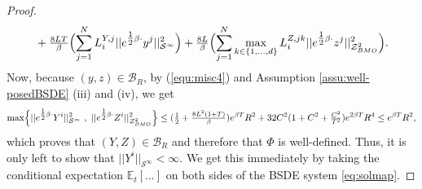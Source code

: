 \documentclass[10pt,a4paper]{article}
\theoremstyle{plain}
\theoremstyle{definition}
\numberwithin{equation}{section}
\begin{document}
\begin{proof}
\begin{align}
& \ \ \ + \tfrac{8LT}{\beta}\Bigl(\sum_{j=1}^{N}L_{i}^{Y,j}||e^{\tfrac{1}{2}\beta\cdot}y^{j}||_{\mathcal{S}^{\infty}}^{2}\Bigr) + \tfrac{8L}{\beta}\Bigl(\sum_{j=1}^{N}\max_{k \in \{1,...,d\}}L_{i}^{Z,jk}||e^{\tfrac{1}{2}\beta\cdot}z^{j}||_{\mathcal{Z}_{BMO}^{2}}^{2}\Bigr).\label{equ:misc4}
\end{align}
Now, because $(y,z) \in \mathcal{B}_{R}$, 
by (\ref{equ:misc4}) and Assumption \ref{assu:well-posedBSDE} (iii) and (iv), we get
\[
\max\Bigl\{||e^{\tfrac{1}{2}\beta\cdot}Y^{i}||_{\mathcal{S}^{\infty}}^{2} \ , \ ||e^{\tfrac{1}{2}\beta\cdot}Z^{i}||_{\mathcal{Z}_{BMO}^{2}}^{2}\Bigr\} \leq (\tfrac{1}{2}+\tfrac{8L^{2}(1+T)}{\beta})e^{\beta T}R^{2} + 32C^{2}(1+C^{2} + \tfrac{C^{2}}{T^{2}})e^{2\beta T}R^{4} \leq e^{\beta T}R^{2},
\]
which proves that $(Y,Z) \in \mathcal{B}_{R}$ and therefore that $\Phi$ is well-defined. Thus, it is only left to show that $||Y^{i}||_{\mathcal{S}^{\infty}}<\infty$. We get this immediately by taking the conditional expectation $\mathbb{E}_{t}[...]$ on both sides of the BSDE system \eqref{eq:solmap}.


\end{proof}
\end{document}
